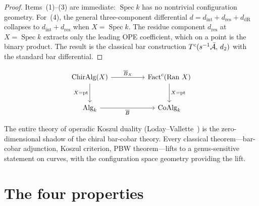 \begin{proof}
Items~(1)--(3) are immediate: $\operatorname{Spec} k$ has no
nontrivial configuration geometry.  For~(4), the general
three-component differential
$d = d_{\mathrm{int}} + d_{\mathrm{res}} + d_{\mathrm{dR}}$
collapses to $d_{\mathrm{int}} + d_{\mathrm{res}}$ when
$X = \operatorname{Spec} k$.  The residue component
$d_{\mathrm{res}}$ at $X = \operatorname{Spec} k$ extracts only the
leading OPE coefficient, which on a point is the binary product.
The result is the classical bar construction
$T^c(s^{-1}\bar{\mathcal{A}},\, d_2)$ with the standard bar differential.
\end{proof}

\begin{equation}\label{eq:fourier-specialization-diagram}
\begin{tikzcd}[column sep=huge, row sep=large]
\mathrm{ChirAlg}(X) \arrow[r, "\barB_X"]
  \arrow[d, "X = \mathrm{pt}"']
& \mathrm{Fact}^c(\Ran\, X) \arrow[d, "X = \mathrm{pt}"] \\
\mathrm{Alg}_k \arrow[r, "\barB"']
& \mathrm{CoAlg}_k
\end{tikzcd}
\end{equation}

\begin{remark}\label{rem:fourier-zero-dim-shadow}
The entire theory of operadic Koszul duality
(Loday--Vallette~\cite{LV12}) is the zero-dimensional shadow of the
chiral bar-cobar theory.  Every classical theorem---bar-cobar
adjunction, Koszul criterion, PBW theorem---lifts to a
genus-sensitive statement on curves, with the configuration space
geometry providing the lift.
\end{remark}


\section{The four properties}\label{sec:fourier-four-properties}

